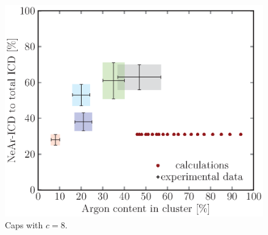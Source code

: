 \begin{figure}[!h]
\begin{minipage}{0.48\textwidth}
    \centering
    \includegraphics[scale=0.5]{pics/caps08.ps}
    \caption{Caps with $c=8$.}
    \label{caps08}
\end{minipage}
\hfill
\begin{minipage}{0.48\textwidth}
    \centering
\end{minipage}
\end{figure}

\FloatBarrier


